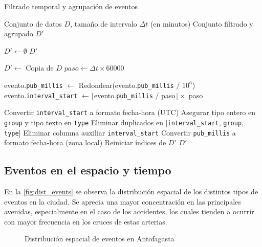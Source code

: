 \documentclass[12pt]{article}
\begin{document}
\begin{algorithm}[H]
\caption{Filtrado temporal y agrupación de eventos}
\label{alg:filter}
\begin{algorithmic}[1]
\Require Conjunto de datos $D$, tamaño de intervalo $\Delta t$ (en minutos)
\Ensure Conjunto filtrado y agrupado $D'$

\State $D' \gets \emptyset$
    \State \Return $D'$
\EndIf

\State $D' \gets$ Copia de $D$
\State $paso \gets \Delta t \times 60000$ 

        \State evento.\texttt{pub\_millis} $\gets$ Redondear(evento.\texttt{pub\_millis} / $10^6$)
    \EndIf
    \State evento.\texttt{interval\_start} $\gets \lfloor$evento.\texttt{pub\_millis} / paso$\rfloor \times$ paso
\EndFor

\State Convertir \texttt{interval\_start} a formato fecha-hora (UTC)
\State Asegurar tipo entero en \texttt{group} y tipo texto en \texttt{type}
\State Eliminar duplicados en [\texttt{interval\_start}, \texttt{group}, \texttt{type}]
\State Eliminar columna auxiliar \texttt{interval\_start}
\State Convertir \texttt{pub\_millis} a formato fecha-hora (zona local)
\State Reiniciar índices de $D'$
\State \Return $D'$
\end{algorithmic}
\end{algorithm}


\subsection{Eventos en el espacio y tiempo}

En la \autoref{fig:dist_events} se observa la distribución espacial de los distintos tipos de eventos en la ciudad. Se aprecia una mayor concentración en las principales avenidas, especialmente en el caso de los accidentes, los cuales tienden a ocurrir con mayor frecuencia en los cruces de estas arterias.

\begin{figure}[H]
    \centering
    \caption{Distribución espacial de eventos en Antofagasta}
    \label{fig:dist_events}
\end{figure}
\end{document}

